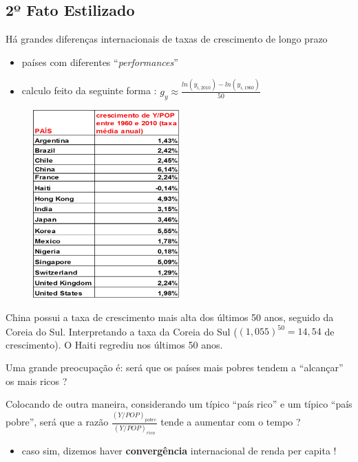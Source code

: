 \documentclass[a4paper,12pt]{article}[abntex2]
\begin{document}
\subsection{\textbf{2º Fato Estilizado}}
Há grandes diferenças internacionais de taxas de crescimento de longo prazo \begin{itemize}
    \item países com diferentes “\textit{performances}”
    \item calculo feito da seguinte forma : $g_y \approx \frac{ln(y_{i,2010})-ln(y_{i,1960})}{50}$
\end{itemize}
\begin{figure}[H]
        \centering
        \includegraphics[width=0.5\textwidth]{Imagens/a1i7.png}
\end{figure}

China possui a taxa de crescimento mais alta dos últimos 50 anos, seguido da Coreia do Sul. Interpretando a taxa da Coreia do Sul ($(1,055)^{50}=14,54$ de crescimento). O Haiti regrediu nos últimos 50 anos.

Uma grande preocupação é: será que os países mais pobres tendem a “alcançar” os mais ricos ?

Colocando de outra maneira, considerando um típico “país rico” e um típico “país pobre”, será que a razão $\frac{(Y/POP)_{pobre}}{(Y/POP)_{rico}}$ tende a aumentar com o tempo ? \begin{itemize}
    \item caso sim, dizemos haver \textbf{convergência} internacional de renda per capita !
\end{itemize}
\end{document}
